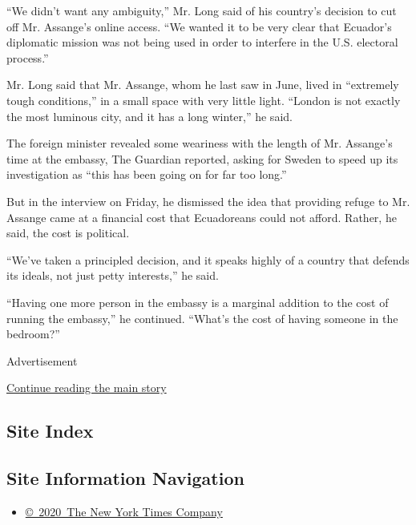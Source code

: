 ``We didn't want any ambiguity,'' Mr. Long said of his country's
decision to cut off Mr. Assange's online access. ``We wanted it to be
very clear that Ecuador's diplomatic mission was not being used in order
to interfere in the U.S. electoral process.''

Mr. Long said that Mr. Assange, whom he last saw in June, lived in
``extremely tough conditions,'' in a small space with very little light.
``London is not exactly the most luminous city, and it has a long
winter,'' he said.

The foreign minister revealed some weariness with the length of Mr.
Assange's time at the embassy, The Guardian reported, asking for Sweden
to speed up its investigation as ``this has been going on for far too
long.''

But in the interview on Friday, he dismissed the idea that providing
refuge to Mr. Assange came at a financial cost that Ecuadoreans could
not afford. Rather, he said, the cost is political.

``We've taken a principled decision, and it speaks highly of a country
that defends its ideals, not just petty interests,'' he said.

``Having one more person in the embassy is a marginal addition to the
cost of running the embassy,'' he continued. ``What's the cost of having
someone in the bedroom?''

Advertisement

\protect\hyperlink{after-bottom}{Continue reading the main story}

\hypertarget{site-index}{%
\subsection{Site Index}\label{site-index}}

\hypertarget{site-information-navigation}{%
\subsection{Site Information
Navigation}\label{site-information-navigation}}

\begin{itemize}
\tightlist
\item
  \href{https://help.nytimes3xbfgragh.onion/hc/en-us/articles/115014792127-Copyright-notice}{©~2020~The
  New York Times Company}
\end{itemize}

